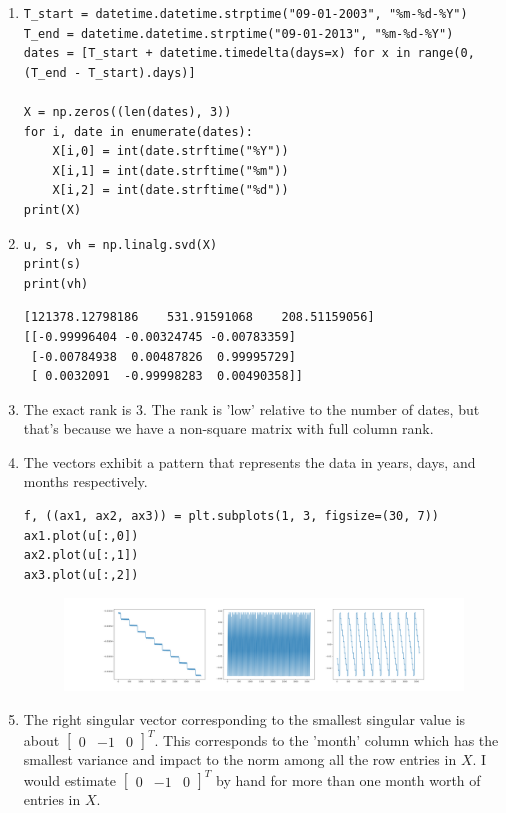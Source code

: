 \documentclass[11pt]{article}
\begin{document}
\begin{solution}
\begin{enumerate}
\item
\begin{verbatim}
T_start = datetime.datetime.strptime("09-01-2003", "%m-%d-%Y")
T_end = datetime.datetime.strptime("09-01-2013", "%m-%d-%Y")
dates = [T_start + datetime.timedelta(days=x) for x in range(0, (T_end - T_start).days)]

X = np.zeros((len(dates), 3))
for i, date in enumerate(dates):
    X[i,0] = int(date.strftime("%Y"))
    X[i,1] = int(date.strftime("%m"))
    X[i,2] = int(date.strftime("%d"))
print(X)
\end{verbatim}

\item
\begin{verbatim}
u, s, vh = np.linalg.svd(X)
print(s)
print(vh)
\end{verbatim}
\begin{verbatim}
[121378.12798186    531.91591068    208.51159056]
[[-0.99996404 -0.00324745 -0.00783359]
 [-0.00784938  0.00487826  0.99995729]
 [ 0.0032091  -0.99998283  0.00490358]]
\end{verbatim}

\item The exact rank is 3. The rank is 'low' relative to the number of dates, but that's because we have a non-square matrix with full column rank.

\item The vectors exhibit a pattern that represents the data in years, days, and months respectively.
\begin{verbatim}
f, ((ax1, ax2, ax3)) = plt.subplots(1, 3, figsize=(30, 7))
ax1.plot(u[:,0])
ax2.plot(u[:,1])
ax3.plot(u[:,2])
\end{verbatim}

\begin{figure}[H]
    \centerline{\includegraphics[width=1.2\textwidth]{figs/left_singular_vectors.png}}
\end{figure}

\item The right singular vector corresponding to the smallest singular value is about $\begin{bmatrix} 0 & -1 & 0 \end{bmatrix}^T$. This corresponds to the 'month' column which has the smallest variance and impact to the norm among all the row entries in $X$. I would estimate $\begin{bmatrix} 0 & -1 & 0\end{bmatrix}^T$ by hand for more than one month worth of entries in $X$.


\end{enumerate}
\end{solution}
\end{document}
